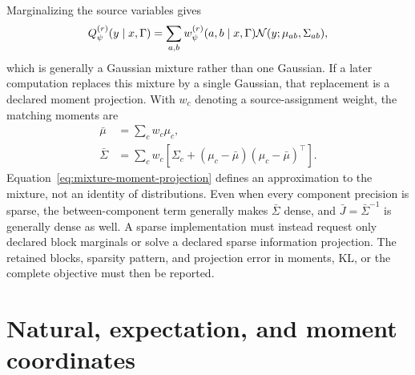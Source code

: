 Marginalizing the source variables gives
\begin{equation}
Q_\psi^{(r)}(y\mid x,\Gamma)
=\sum_{a,b}w_\psi^{(r)}(a,b\mid x,\Gamma)
\mathcal N(y;\mu_{ab},\Sigma_{ab}),
\label{eq:source-marginal-gaussian-mixture}
\end{equation}
which is generally a Gaussian mixture rather than one Gaussian.  If a later computation replaces this mixture by a single Gaussian, that replacement is a declared moment projection.  With $w_c$ denoting a source-assignment weight, the matching moments are
\begin{equation}
\begin{aligned}
\bar\mu&=\sum_cw_c\mu_c,\\
\bar\Sigma&=\sum_cw_c
\left[
\Sigma_c+(\mu_c-\bar\mu)(\mu_c-\bar\mu)^\top
\right].
\end{aligned}
\label{eq:mixture-moment-projection}
\end{equation}
Equation~\eqref{eq:mixture-moment-projection} defines an approximation to the mixture, not an identity of distributions. Even when every component precision is sparse, the between-component term generally makes $\bar\Sigma$ dense, and $\bar J=\bar\Sigma^{-1}$ is generally dense as well. A sparse implementation must instead request only declared block marginals or solve a declared sparse information projection. The retained blocks, sparsity pattern, and projection error in moments, KL, or the complete objective must then be reported.

\section{Natural, expectation, and moment coordinates}

